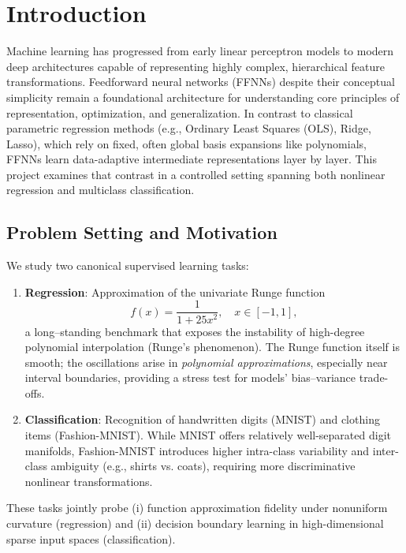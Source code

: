\documentclass[amssymb,twocolumn,aps]{revtex4}
\begin{document}
\maketitle
\newpage
\clearpage

\setcounter{page}{1}  
\twocolumngrid
{}
\section{Introduction}

Machine learning has progressed from early linear perceptron models to modern deep architectures capable of representing highly complex, hierarchical feature transformations. Feedforward neural networks (FFNNs) despite their conceptual simplicity remain a foundational architecture for understanding core principles of representation, optimization, and generalization. In contrast to classical parametric regression methods (e.g., Ordinary Least Squares (OLS), Ridge, Lasso), which rely on fixed, often global basis expansions like polynomials, FFNNs learn data-adaptive intermediate representations layer by layer. This project examines that contrast in a controlled setting spanning both nonlinear regression and multiclass classification.

\subsection*{Problem Setting and Motivation}
We study two canonical supervised learning tasks:
\begin{enumerate}
    \item \textbf{Regression}: Approximation of the univariate Runge function
    \[
        f(x)=\frac{1}{1+25x^2}, \quad x\in[-1,1],
    \]
  a long–standing benchmark that exposes the instability of high-degree polynomial interpolation (Runge’s phenomenon). The Runge function itself is smooth; the oscillations arise in \emph{polynomial approximations}, especially near interval boundaries, providing a stress test for models’ bias–variance trade-offs.
    \item \textbf{Classification}: Recognition of handwritten digits (MNIST) and clothing items (Fashion-MNIST). While MNIST offers relatively well-separated digit manifolds, Fashion-MNIST introduces higher intra-class variability and inter-class ambiguity (e.g., shirts vs. coats), requiring more discriminative nonlinear transformations.
\end{enumerate}
These tasks jointly probe (i) function approximation fidelity under nonuniform curvature (regression) and (ii) decision boundary learning in high-dimensional sparse input spaces (classification).
\end{document}
